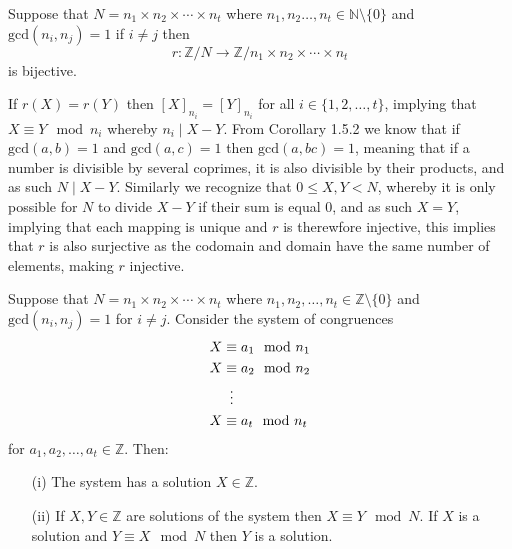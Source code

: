 \begin{lemm}
    Suppose that $N=n_{1}\times n_{2}\times\cdots\times n_{t}$ where $n_{1},n_{2}\ldots,n_{t}\in\mathbb{N}\setminus\{0\}$ and $\text{gcd}(n_{i},n_{j})=1$ if $i\neq j$ then
    \[
        r:\mathbb{Z}/N\rightarrow\mathbb{Z}/n_{1}\times n_{2}\times\cdots\times n_{t}
    \]
    is bijective.
\end{lemm}
\begin{prf}
    If $r(X)=r(Y)$ then $[X]_{n_{i}}=[Y]_{n_{i}}$ for all $i\in\{1,2,\ldots,t\}$, implying that $X\equiv Y\mod n_{i}$ whereby $n_{i}\mid X-Y$. From Corollary 1.5.2 we know that if $\text{gcd}(a,b)=1$ and $\text{gcd}(a,c)=1$ then $\text{gcd}(a,bc)=1$, meaning that if a number is divisible by several coprimes, it is also divisible by their products, and as such $N\mid X-Y$. Similarly we recognize that $0\leq X,Y<N$, whereby it is only possible for $N$ to divide $X-Y$ if their sum is equal 0, and as such $X=Y$, implying that each mapping is unique and $r$ is therewfore injective, this implies that $r$ is also surjective as the codomain and domain have the same number of elements, making $r$ injective.
\end{prf}
\begin{theo}
    Suppose that $N=n_{1}\times n_{2}\times\cdots\times n_{t}$ where $n_{1},n_{2},\ldots,n_{t}\in\mathbb{Z}\setminus\{0\}$ and $\text{gcd}(n_{i},n_{j})=1$ for $i\neq j$. Consider the system of congruences
    \begin{align*}
        X&\equiv a_{1}\mod n_{1} \\
      X&\equiv a_{2}\mod n_{2} \\
       &\vdotswithin{\equiv} \\
      X&\equiv a_{t}\mod n_{t}
    \end{align*}
    for $a_{1},a_{2},\ldots,a_{t}\in\mathbb{Z}$. Then:
    \begin{itemize}
        \item[(i)] The system has a solution $X\in\mathbb{Z}$.
        \item[(ii)] If $X,Y\in\mathbb{Z}$ are solutions of the system then $X\equiv Y\mod N$. If $X$ is a solution and $Y\equiv X\mod N$ then $Y$ is a solution.
    \end{itemize}
\end{theo}
